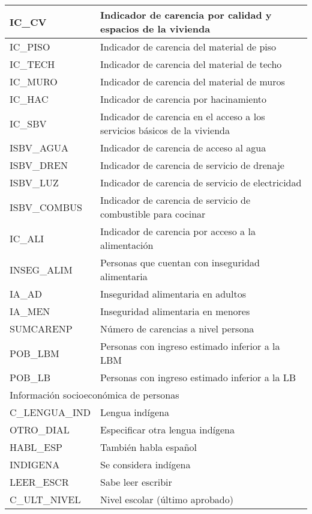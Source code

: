\begin{longtable}{|p{8cm}|p{8cm}|}
    \hline
    IC\_CV & Indicador de carencia por calidad y espacios de la vivienda \\
    \hline
    IC\_PISO & Indicador de carencia del material de piso \\
    \hline
    IC\_TECH & Indicador de carencia del material de techo \\
    \hline
    IC\_MURO & Indicador de carencia del material de muros \\
    \hline
    IC\_HAC & Indicador de carencia por hacinamiento \\
    \hline
    IC\_SBV & Indicador de carencia en el acceso a los servicios básicos de la vivienda \\
    \hline
    ISBV\_AGUA & Indicador de carencia de acceso al agua \\
    \hline
    ISBV\_DREN & Indicador de carencia de servicio de drenaje \\
    \hline
    ISBV\_LUZ & Indicador de carencia de servicio de electricidad \\
    \hline
    ISBV\_COMBUS & Indicador de carencia de servicio de combustible para cocinar \\
    \hline
    IC\_ALI & Indicador de carencia por acceso a la alimentación \\
    \hline
    INSEG\_ALIM & Personas que cuentan con inseguridad alimentaria \\
    \hline
    IA\_AD & Inseguridad alimentaria en adultos \\
    \hline
    IA\_MEN & Inseguridad alimentaria en menores \\
    \hline
    SUMCARENP & Número de carencias a nivel persona \\
    \hline
    POB\_LBM & Personas con ingreso estimado inferior a la LBM \\
    \hline
    POB\_LB & Personas con ingreso estimado inferior a la LB \\
    \hline
    \hline
    \multicolumn{2}{l}{Información socioeconómica de personas}\\
    \hline
    C\_LENGUA\_IND & Lengua indígena \\
    \hline
    OTRO\_DIAL & Especificar otra lengua indígena\\
    \hline
    HABL\_ESP & También habla español \\
    \hline
    INDIGENA & Se considera indígena \\
    \hline
    LEER\_ESCR & Sabe leer escribir \\
    \hline
    C\_ULT\_NIVEL & Nivel escolar (último aprobado) \\

\end{longtable}
